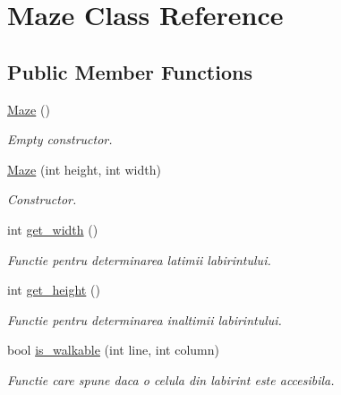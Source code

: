 \hypertarget{classMaze}{
\section{Maze Class Reference}
\label{classMaze}
}
\subsection*{Public Member Functions}
\begin{DoxyCompactItemize}
\item 
\hypertarget{classMaze_a7ecf1da4b9685f97bf3110a8479e724b}{
\hyperlink{classMaze_a7ecf1da4b9685f97bf3110a8479e724b}{Maze} ()}
\label{classMaze_a7ecf1da4b9685f97bf3110a8479e724b}

\begin{DoxyCompactList}\small\item\em Empty constructor. \item\end{DoxyCompactList}\item 
\hyperlink{classMaze_a8f1cc7d8dd3fa426ace16bf32f54f24f}{Maze} (int height, int width)
\begin{DoxyCompactList}\small\item\em Constructor. \item\end{DoxyCompactList}\item 
int \hyperlink{classMaze_a3f9b79edb99a9726da62bc6823ea9149}{get\_\-width} ()
\begin{DoxyCompactList}\small\item\em Functie pentru determinarea latimii labirintului. \item\end{DoxyCompactList}\item 
int \hyperlink{classMaze_a43a3408e506b2f2463fc985865b3c850}{get\_\-height} ()
\begin{DoxyCompactList}\small\item\em Functie pentru determinarea inaltimii labirintului. \item\end{DoxyCompactList}\item 
bool \hyperlink{classMaze_a5d7d899c754bf105236387ac3076ea32}{is\_\-walkable} (int line, int column)
\begin{DoxyCompactList}\small\item\em Functie care spune daca o celula din labirint este accesibila. \item\end{DoxyCompactList}\item 

\end{DoxyCompactItemize}

